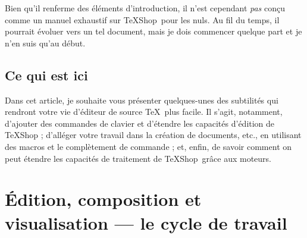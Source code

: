 \documentclass[11pt,french]{article}
\newcommand{\TS}{\textsf{\TeX Shop}}
\begin{document}
Bien qu'il renferme des éléments d'introduction, il n'est cependant \emph{pas} conçu comme un manuel exhaustif sur \TS\ pour les nuls. Au fil du temps, il pourrait évoluer vers un tel document, mais je dois commencer quelque part et je n'en suis qu'au début.

%

\subsection{Ce qui est ici}

Dans cet article, je souhaite vous présenter quelques-unes des subtilités qui rendront votre vie d'éditeur de source \TeX\ plus facile. Il s'agit, notamment, d'ajouter des commandes de clavier et d'étendre les capacités d'édition de \TS{} ; d'alléger votre travail dans la création de documents, etc., en utilisant des macros et le complètement de commande ; et, enfin, de savoir comment on peut étendre les capacités de traitement de \TS\ grâce aux moteurs.


\section{Édition, composition et visualisation --- le cycle de travail}
\end{document}
